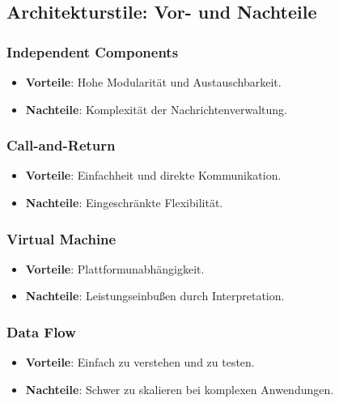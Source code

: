 \subsection{Architekturstile: Vor- und Nachteile}

\subsubsection{Independent Components}

\begin{itemize}
    \item \textbf{Vorteile}: Hohe Modularität und Austauschbarkeit.
    \item \textbf{Nachteile}: Komplexität der Nachrichtenverwaltung.
\end{itemize}

\subsubsection{Call-and-Return}

\begin{itemize}
    \item \textbf{Vorteile}: Einfachheit und direkte Kommunikation.
    \item \textbf{Nachteile}: Eingeschränkte Flexibilität.
\end{itemize}

\subsubsection{Virtual Machine}

\begin{itemize}
    \item \textbf{Vorteile}: Plattformunabhängigkeit.
    \item \textbf{Nachteile}: Leistungseinbußen durch Interpretation.
\end{itemize}

\subsubsection{Data Flow}

\begin{itemize}
    \item \textbf{Vorteile}: Einfach zu verstehen und zu testen.
    \item \textbf{Nachteile}: Schwer zu skalieren bei komplexen Anwendungen.
\end{itemize}

